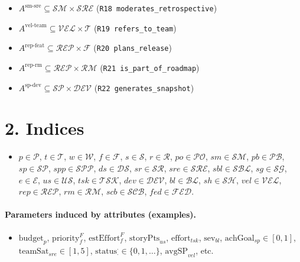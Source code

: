 \documentclass[11pt,a4paper]{article}
\begin{document}
\begin{itemize}
  \item $A^{\text{sm-sre}} \subseteq \mathcal{SM}\times\mathcal{SRE}$ (\texttt{R18 moderates\_retrospective})
  \item $A^{\text{vel-team}} \subseteq \mathcal{VEL}\times\mathcal{T}$ (\texttt{R19 refers\_to\_team})
  \item $A^{\text{rep-feat}} \subseteq \mathcal{REP}\times\mathcal{F}$ (\texttt{R20 plans\_release})
  \item $A^{\text{rep-rm}} \subseteq \mathcal{REP}\times\mathcal{RM}$ (\texttt{R21 is\_part\_of\_roadmap})
  \item $A^{\text{sp-dev}} \subseteq \mathcal{SP}\times\mathcal{DEV}$ (\texttt{R22 generates\_snapshot})
\end{itemize}

\section{2. Indices}
\begin{itemize}
  \item $p\in\mathcal{P}$, $t\in\mathcal{T}$, $w\in\mathcal{W}$, $f\in\mathcal{F}$, $s\in\mathcal{S}$, $r\in\mathcal{R}$, $po\in\mathcal{PO}$, $sm\in\mathcal{SM}$,
  $pb\in\mathcal{PB}$, $sp\in\mathcal{SP}$, $spp\in\mathcal{SPP}$, $ds\in\mathcal{DS}$, $sr\in\mathcal{SR}$, $sre\in\mathcal{SRE}$, $sbl\in\mathcal{SBL}$,
  $sg\in\mathcal{SG}$, $e\in\mathcal{E}$, $us\in\mathcal{US}$, $tsk\in\mathcal{TSK}$, $dev\in\mathcal{DEV}$, $bl\in\mathcal{BL}$, $sh\in\mathcal{SH}$, $vel\in\mathcal{VEL}$,
  $rep\in\mathcal{REP}$, $rm\in\mathcal{RM}$, $scb\in\mathcal{SCB}$, $fed\in\mathcal{FED}$.
\end{itemize}

\paragraph{Parameters induced by attributes (examples).}
\begin{itemize}
  \item $\text{budget}_p$, $\text{priority}^F_f$, $\text{estEffort}^F_f$, $\text{storyPts}_{us}$, $\text{effort}_{tsk}$, $\text{sev}_{bl}$,
        $\text{achGoal}_{sp}\in[0,1]$, $\text{teamSat}_{sre}\in[1,5]$, $\text{status}^\cdot_{\cdot}\in\{0,1,\dots\}$, $\text{avgSP}_{vel}$, etc.
\end{itemize}
\end{document}
